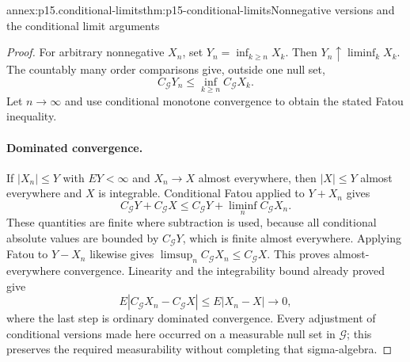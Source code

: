 \begin{annexitem}{annex:p15.conditional-limits}{thm:p15-conditional-limits}{Nonnegative versions and the conditional limit arguments}
\begin{proof}
For arbitrary nonnegative \(X_n\), set \(Y_n=\inf_{k\geq n}X_k\).
Then \(Y_n\uparrow\liminf_kX_k\).
The countably many order comparisons give, outside one null set,
\[
                       C_{\mathcal G}Y_n
                               \leq\inf_{k\geq n}C_{\mathcal G}X_k.
\]
Let \(n\to\infty\) and use conditional monotone convergence to obtain
the stated Fatou inequality.

\paragraph{Dominated convergence.}
If \(|X_n|\leq Y\) with \(EY<\infty\) and \(X_n\to X\) almost
everywhere, then \(|X|\leq Y\) almost everywhere and \(X\) is integrable.
Conditional Fatou applied to \(Y+X_n\) gives
\[
                   C_{\mathcal G}Y+C_{\mathcal G}X
                      \leq C_{\mathcal G}Y+\liminf_nC_{\mathcal G}X_n.
\]
These quantities are finite where subtraction is used, because
all conditional absolute values are bounded by \(C_{\mathcal G}Y\),
which is finite almost everywhere. Applying Fatou to \(Y-X_n\)
likewise gives \(\limsup_nC_{\mathcal G}X_n\leq C_{\mathcal G}X\).
This proves almost-everywhere convergence.
Linearity and the integrability bound already proved give
\[
            E|C_{\mathcal G}X_n-C_{\mathcal G}X|\leq E|X_n-X|\to0,
\]
where the last step is ordinary dominated convergence.
Every adjustment of conditional versions made here occurred on a
measurable null set in \(\mathcal G\); this preserves the required
measurability without completing that sigma-algebra.
\end{proof}
\end{annexitem}

